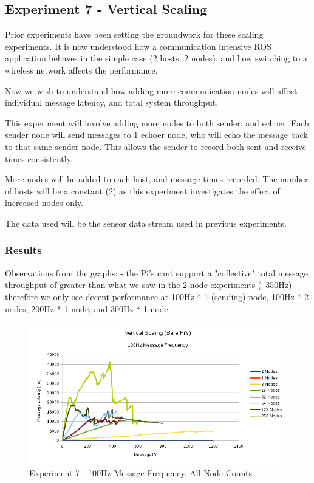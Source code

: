 \documentclass[../dissertation.tex]{subfiles}
\begin{document}
\subsection{Experiment 7 - Vertical Scaling}
\label{experiment7-vertical-scaling}

Prior experiments have been setting the groundwork for these scaling experiments. It is now understood how a communication intensive ROS application behaves in the simple case (2 hosts, 2 nodes), and how switching to a wireless network affects the performance.

Now we wish to understand how adding more communication nodes will affect individual message latency, and total system throughput.

This experiment will involve adding more nodes to both sender, and echoer. Each sender node will send messages to 1 echoer node, who will echo the message back to that same sender node. This allows the sender to record both sent and receive times consistently.

More nodes will be added to each host, and message times recorded. The number of hosts will be a constant (2) as this experiment investigates the effect of increased nodes only.

The data used will be the sensor data stream used in previous experiments.

\subsubsection{Results}

Observations from the graphs:
- the Pi's cant support a "collective" total message throughput of greater than what we saw in the 2 node experiments (~350Hz)
- therefore we only see decent performance at 100Hz * 1 (sending) node, 100Hz * 2 nodes, 200Hz * 1 node, and 300Hz * 1 node.

\begin{figure}[H]
\centering
\includegraphics[width=\textwidth]{images/experiment7/vertical_scaling_100hz_all_freqs.png}
\caption{Experiment 7 - 100Hz Message Frequency, All Node Counts}
\label{exp7-100hz-allnodes}
\end{figure}
\end{document}
